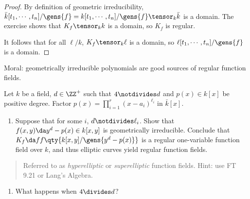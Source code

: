 \begin{proof}

By definition of geometric irreducibility,
\(\bar k[t_1, \cdots, t_n]/\gens{f} = k[t_1, \cdots, t_n]/\gens{f} \tensor_k \bar k\)
is a domain. The exercise shows that \(K_f \tensor_k k\) is a domain, so
\(K_f\) is regular.

It follows that for all \(\ell/k\), \(K_f \tensor_k \ell\) is a domain,
so \(\ell[t_1, \cdots, t_n]/\gens{f}\) is a domain.

\end{proof}

Moral: geometrically irreducible polynomials are good sources of regular
function fields.

\begin{exercise}

Let \(k\) be a field, \(d\in \ZZ^+\) such that \(4\notdivides d\) and
\(p(x) \in k[x]\) be positive degree. Factor
\(p(x) = \prod_{i=1}^r (x-a_i)^{\ell_i}\) in \(\bar k[x]\).

\begin{enumerate}
\def\labelenumi{\alph{enumi}.}
\tightlist
\item
  Suppose that for some \(i\), \(d\notdivides \ell_i\). Show that
  \(f(x, y) \da y^d - p(x) \in k[x, y]\) is geometrically irreducible.
  Conclude that \(K_f \da ff\qty{k[x, y] / \gens{y^d - p(x)}}\) is a
  regular one-variable function field over \(k\), and thus elliptic
  curves yield regular function fields.
\end{enumerate}

\begin{quote}
Referred to as \emph{hyperelliptic} or \emph{superelliptic} function
fields. Hint: use FT 9.21 or Lang's Algebra.
\end{quote}

\begin{enumerate}
\def\labelenumi{\alph{enumi}.}
\setcounter{enumi}{1}
\tightlist
\item
  What happens when \(4\divides d\)?
\end{enumerate}

\end{exercise}


